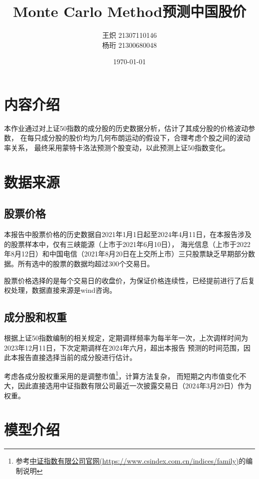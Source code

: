 \documentclass{article}
\title{\textbf{\huge{Monte Carlo Method预测中国股价}}}
\date{\today}
\author{王炽 21307110146 \\ 杨珩 21300680048}
\begin{document}
    \maketitle
    \section{内容介绍}
    \qquad 本作业通过对上证50指数的成分股的历史数据分析，估计了其成分股的价格波动参数，
    在每只成分股的股价均为几何布朗运动的假设下，合理考虑个股之间的波动率关系，
    最终采用蒙特卡洛法预测个股变动，以此预测上证50指数变化。
    \section{数据来源}
    \subsection{股票价格}
    \qquad 本报告中股票价格的历史数据自2021年1月1日起至2024年4月11日，在本报告涉及的股票样本中，仅有三峡能源（上市于2021年6月10日），
    海光信息（上市于2022年8月12日）和中国电信（2021年8月20日在上交所上市）三只股票缺乏早期部分数据。所有选中的股票的数据均超过300个交易日。

    \qquad  股票价格选择的是每个交易日的收盘价，为保证价格连续性，已经提前进行了后复权处理，数据直接来源是wind咨询。
    \subsection{成分股和权重}
    \qquad 根据上证50指数编制的相关规定，定期调样频率为每半年一次，上次调样时间为2023年12月11日，下次定期调样在2024年六月，超出本报告
    预测的时间范围，因此本报告直接选择当前的成分股进行估计。
    
    \qquad 考虑各成分股权重采用的是调整市值\footnote{参考\href{https://www.csindex.com.cn/indices/family}{中证指数有限公司官网(https://www.csindex.com.cn/indices/family)}的编制说明}，计算方法复杂，
    而短期之内市值变化不大，因此直接选用中证指数有限公司最近一次披露交易日（2024年3月29日）作为权重。
    \section{模型介绍}
\end{document}
